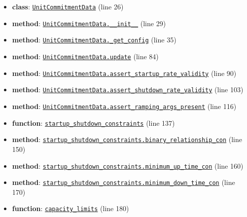 \documentclass[11pt]{report}
\begin{document}
\begin{itemize}[leftmargin=*]
  \item \textbf{class}: \hyperref[def:pricetaker-unit_commitment.py:UnitCommitmentData:L26]{\texttt{UnitCommitmentData}} (line 26)
  \item \textbf{method}: \hyperref[def:pricetaker-unit_commitment.py:UnitCommitmentData.__init__:L29]{\texttt{UnitCommitmentData.\_\_init\_\_}} (line 29)
  \item \textbf{method}: \hyperref[def:pricetaker-unit_commitment.py:UnitCommitmentData._get_config:L35]{\texttt{UnitCommitmentData.\_get\_config}} (line 35)
  \item \textbf{method}: \hyperref[def:pricetaker-unit_commitment.py:UnitCommitmentData.update:L84]{\texttt{UnitCommitmentData.update}} (line 84)
  \item \textbf{method}: \hyperref[def:pricetaker-unit_commitment.py:UnitCommitmentData.assert_startup_rate_validity:L90]{\texttt{UnitCommitmentData.assert\_startup\_rate\_validity}} (line 90)
  \item \textbf{method}: \hyperref[def:pricetaker-unit_commitment.py:UnitCommitmentData.assert_shutdown_rate_validity:L103]{\texttt{UnitCommitmentData.assert\_shutdown\_rate\_validity}} (line 103)
  \item \textbf{method}: \hyperref[def:pricetaker-unit_commitment.py:UnitCommitmentData.assert_ramping_args_present:L116]{\texttt{UnitCommitmentData.assert\_ramping\_args\_present}} (line 116)
  \item \textbf{function}: \hyperref[def:pricetaker-unit_commitment.py:startup_shutdown_constraints:L137]{\texttt{startup\_shutdown\_constraints}} (line 137)
  \item \textbf{method}: \hyperref[def:pricetaker-unit_commitment.py:startup_shutdown_constraints.binary_relationship_con:L150]{\texttt{startup\_shutdown\_constraints.binary\_relationship\_con}} (line 150)
  \item \textbf{method}: \hyperref[def:pricetaker-unit_commitment.py:startup_shutdown_constraints.minimum_up_time_con:L160]{\texttt{startup\_shutdown\_constraints.minimum\_up\_time\_con}} (line 160)
  \item \textbf{method}: \hyperref[def:pricetaker-unit_commitment.py:startup_shutdown_constraints.minimum_down_time_con:L170]{\texttt{startup\_shutdown\_constraints.minimum\_down\_time\_con}} (line 170)
  \item \textbf{function}: \hyperref[def:pricetaker-unit_commitment.py:capacity_limits:L180]{\texttt{capacity\_limits}} (line 180)

\end{itemize}
\end{document}
